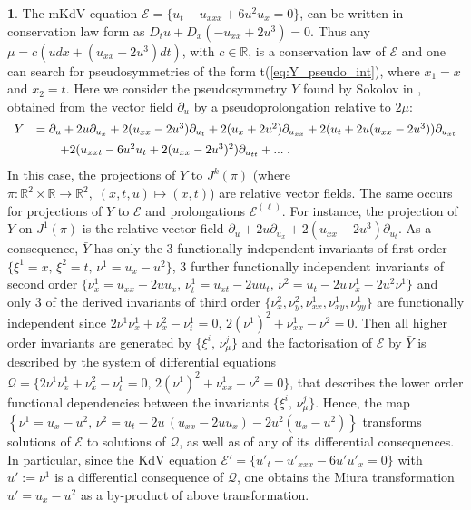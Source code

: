 \documentclass[12pt,english]{elsarticle}
\theoremstyle{plain}
\theoremstyle{plain}
\theoremstyle{remark}
\theoremstyle{plain}
\theoremstyle{definition}
\theoremstyle{definition}
\newtheorem{example}[thm]{\protect\examplename}
\providecommand{\examplename}{Example}
\begin{document}
\begin{example}
\label{exa:Miura-II}%
The mKdV equation $\mathcal{E}=\{u_{t}-u_{xxx}+6u^{2}u_{x}=0\}$, can be
written in conservation law form as
$D_{t}u+D_{x}\left (-u_{xx}+2u^{3}\right )=0$. Thus any
$\mu =c\left (udx+(u_{xx}-2u^{3})dt\right )$, with $c\in \mathbb{R}$, is
a conservation law of $\mathcal{E}$ and one can search for pseudosymmetries
of the form t{(\ref{eq:Y_pseudo_int})}, where $x_{1}=x$ and $x_{2}=t$. Here
we consider the pseudosymmetry $\bar{Y}$ found by Sokolov in
\cite{Sokolov}, obtained from the vector field $\partial _{u}$ by a pseudoprolongation
relative to $2\mu $:
%
\begin{equation*}
%
\begin{array}{l@{\quad}l}
Y & =\partial _{u}+2u\partial _{u_{x}}+2(u_{xx}-2u^{3})\partial _{u_{t}}+2(u_{x}+2u^{2})
\partial _{u_{xx}}+2(u_{t}+2u(u_{xx}-2u^{3}))\partial _{u_{xt}}
\vspace{5pt}
\\
& \qquad +2(u_{xxt}-6u^{2}u_{t}+2(u_{xx}-2u^{3})^{2})\partial _{u_{tt}}+...
\;.
\end{array}
%
\end{equation*}
%
In this case, the projections of $Y$ to $J^{k}(\pi )$ (where
$\pi :\mathbb{R}^{2}\times \mathbb{R}\rightarrow \mathbb{R}^{2},\;(x,t,u)
\mapsto (x,t)$) are relative vector fields. The same occurs for projections
of $Y$ to $\mathcal{E}$ and prolongations $\mathcal{E}^{(\ell )}$. For
instance, the projection of $Y$ on $J^{1}(\pi )$ is the relative vector
field
$\partial _{u}+2u\partial _{u_{x}}+2(u_{xx}-2u^{3})\partial _{u_{t}}$.
As a consequence, $\bar{Y}$ has only the $3$ functionally independent invariants
of first order $\{\xi ^{1}=x,\,\xi ^{2}=t,\,\nu ^{1}=u_{x}-u^{2}\}$,
$3$ further functionally independent invariants of second order
$\{\nu _{x}^{1}=u_{xx}-2uu_{x},\,\nu _{t}^{1}=u_{xt}-2uu_{t},\,\nu ^{2}=u_{t}-2u
\,\nu _{x}^{1}-2u^{2}\nu ^{1}\}$ and only $3$ of the derived invariants
of third order
$\{\nu _{x}^{2},\nu _{y}^{2},\nu _{xx}^{1},\nu _{xy}^{1},\nu _{yy}^{1}
\}$ are functionally independent since
$2\nu ^{1}\nu _{x}^{1}+\nu _{x}^{2}-\nu _{t}^{1}=0$,
$2\left (\nu ^{1}\right )^{2}+\nu _{xx}^{1}-\nu ^{2}=0$. Then all higher
order invariants are generated by $\{\xi ^{i},\,\nu _{\mu}^{j}\}$ and the
factorisation of $\mathcal{E}$ by $\bar{Y}$ is described by the system
of differential equations
$\mathcal{Q}=\{2\nu ^{1}\nu _{x}^{1}+\nu _{x}^{2}-\nu _{t}^{1}=0,\,2
\left (\nu ^{1}\right )^{2}+\nu _{xx}^{1}-\nu ^{2}=0\}$, that describes
the lower order functional dependencies between the invariants
$\{\xi ^{i},\,\nu _{\mu}^{j}\}$. Hence, the map
$\left \{ \nu ^{1}=u_{x}-u^{2},\,\nu ^{2}=u_{t}-2u\,\left (u_{xx}-2uu_{x}
\right )-2u^{2}\left (u_{x}-u^{2}\right )\right \} $ transforms solutions
of $\mathcal{E}$ to solutions of $\mathcal{Q}$, as well as of any of its
differential consequences. In particular, since the KdV equation
$\mathcal{E}'=\{u'_{t}-u'_{xxx}-6u'u'_{x}=0\}$ with $u':=\nu ^{1}$ is a
differential consequence of $\mathcal{Q}$, one obtains the Miura transformation
$u'=u_{x}-u^{2}$ as a by-product of above transformation.
\end{example}
\end{document}
